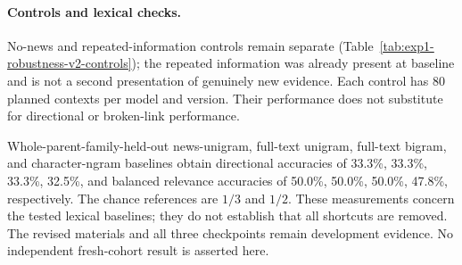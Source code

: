 \paragraph{Controls and lexical checks.}
No-news and repeated-information controls remain separate
(Table~\ref{tab:exp1-robustness-v2-controls}); the repeated information was already
present at baseline and is not a second presentation of genuinely new evidence.
Each control has 80 planned contexts per model and version. Their performance
does not substitute for directional or broken-link performance.

\begin{center}
\begin{minipage}{\linewidth}
\centering
{}
\label{tab:exp1-robustness-v2-controls}
\small
\resizebox{\linewidth}{!}{}
\end{minipage}
\end{center}

Whole-parent-family-held-out news-unigram, full-text unigram, full-text bigram,
and character-ngram baselines obtain directional accuracies of 33.3\%, 33.3\%, 33.3\%, 32.5\%,
and balanced relevance accuracies of 50.0\%, 50.0\%, 50.0\%, 47.8\%, respectively. The chance
references are $1/3$ and $1/2$. These measurements concern the tested lexical
baselines; they do not establish that all shortcuts are removed. The revised
materials and all three checkpoints remain development evidence. No independent
fresh-cohort result is asserted here.
